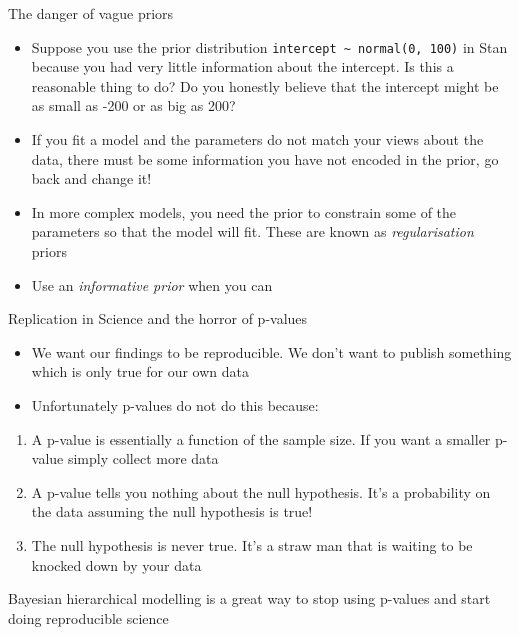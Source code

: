 \documentclass[ignorenonframetext,]{beamer}
\providecommand{\tightlist}{%
  \setlength{\itemsep}{0pt}\setlength{\parskip}{0pt}}
\begin{document}
\begin{frame}[fragile]{The danger of vague priors}

\begin{itemize}
\tightlist
\item
  Suppose you use the prior distribution
  \texttt{intercept\ \textasciitilde{}\ normal(0,\ 100)} in Stan because
  you had very little information about the intercept. Is this a
  reasonable thing to do? Do you honestly believe that the intercept
  might be as small as -200 or as big as 200?
\item
  If you fit a model and the parameters do not match your views about
  the data, there must be some information you have not encoded in the
  prior, go back and change it!
\item
  In more complex models, you need the prior to constrain some of the
  parameters so that the model will fit. These are known as
  \emph{regularisation} priors
\item
  Use an \emph{informative prior} when you can
\end{itemize}

\end{frame}

\begin{frame}{Replication in Science and the horror of p-values}

\begin{itemize}
\tightlist
\item
  We want our findings to be reproducible. We don't want to publish
  something which is only true for our own data
\item
  Unfortunately p-values do not do this because:
\end{itemize}

\begin{enumerate}
\def\labelenumi{\arabic{enumi}.}
\tightlist
\item
  A p-value is essentially a function of the sample size. If you want a
  smaller p-value simply collect more data
\item
  A p-value tells you nothing about the null hypothesis. It's a
  probability on the data assuming the null hypothesis is true!
\item
  The null hypothesis is never true. It's a straw man that is waiting to
  be knocked down by your data
\end{enumerate}

Bayesian hierarchical modelling is a great way to stop using p-values
and start doing reproducible science

\end{frame}
\end{document}
